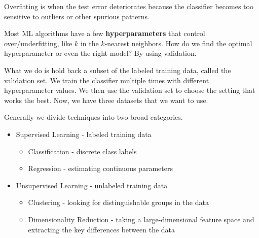 \begin{definition}[Overfitting]
    Overfitting is when the test error deteriorates because the classifier becomes too sensitive to outliers or other spurious patterns.
\end{definition}

Most ML algorithms have a few \textbf{hyperparameters} that control over/underfitting, like $k$ in the $k$-nearest neighbors. How do we find the
optimal hyperparameter or even the right model? By using validation.

What we do is hold back a subset of the labeled training data, called the validation set. We train the classifier multiple
times with different hyperparameter values. We then use the validation set to choose the setting that works the best. Now, we have three datasets that we want to use.

Generally we divide techniques into two broad categories.
\begin{itemize}
    \item Supervised Learning - labeled training data
    \begin{itemize}
        \item Classification - discrete class labels
        \item Regression - estimating continuous parameters
    \end{itemize}
    \item Unsupervised Learning - unlabeled training data
    \begin{itemize}
        \item Clustering - looking for distinguishable groups in the data
        \item Dimensionality Reduction - taking a large-dimensional feature space and extracting the key differences between the data
    \end{itemize}
\end{itemize}